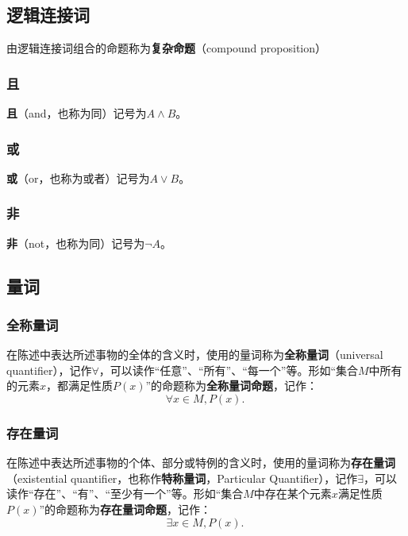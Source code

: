 \subsection{逻辑连接词}\label{sub_HsLogi_1}

由逻辑连接词组合的命题称为\textbf{复杂命题}（compound proposition）

\subsubsection{且}

\textbf{且}（and，也称为同）记号为$A\land B$。

\subsubsection{或}

\textbf{或}（or，也称为或者）记号为$A\lor B$。


\subsubsection{非}
\textbf{非}（not，也称为同）记号为$\lnot A$。

\subsection{量词}

\subsubsection{全称量词}

在陈述中表达所述事物的全体的含义时，使用的量词称为\textbf{全称量词}（universal quantifier），记作$\forall$，可以读作“任意”、“所有”、“每一个”等。形如“集合$M$中所有的元素$x$，都满足性质$P(x)$”的命题称为\textbf{全称量词命题}，记作：
\begin{equation}
\forall x\in M,P(x).~
\end{equation}


\subsubsection{存在量词}

在陈述中表达所述事物的个体、部分或特例的含义时，使用的量词称为\textbf{存在量词}（existential quantifier，也称作\textbf{特称量词}，Particular Quantifier），记作$\exists$，可以读作“存在”、“有”、“至少有一个”等。形如“集合$M$中存在某个元素$x$满足性质$P(x)$”的命题称为\textbf{存在量词命题}，记作：
\begin{equation}
\exists x\in M,P(x).~
\end{equation}

